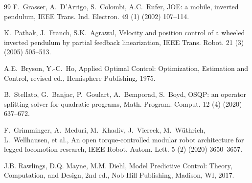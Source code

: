 \documentclass[a4paper,fleqn]{cas-dc}
\begin{document}
\begin{thebibliography}{99}
F.~Grasser, A.~D'Arrigo, S.~Colombi, A.C.~Rufer, JOE: a mobile, inverted
pendulum, IEEE Trans. Ind. Electron. 49 (1) (2002) 107--114.

K.~Pathak, J.~Franch, S.K.~Agrawal, Velocity and position control of a wheeled
inverted pendulum by partial feedback linearization, IEEE Trans. Robot. 21 (3)
(2005) 505--513.

A.E.~Bryson, Y.-C.~Ho, Applied Optimal Control: Optimization, Estimation and
Control, revised ed., Hemisphere Publishing, 1975.

B.~Stellato, G.~Banjac, P.~Goulart, A.~Bemporad, S.~Boyd, OSQP: an operator
splitting solver for quadratic programs, Math. Program. Comput. 12 (4) (2020)
637--672.

F.~Grimminger, A.~Meduri, M.~Khadiv, J.~Viereck, M.~W\"{u}thrich,
L.~Wellhausen, et al., An open torque-controlled modular robot architecture for
legged locomotion research, IEEE Robot. Autom. Lett. 5 (2) (2020) 3650--3657.

J.B. Rawlings, D.Q. Mayne, M.M. Diehl, Model Predictive Control: Theory,
Computation, and Design, 2nd ed., Nob Hill Publishing, Madison, WI, 2017.

\end{thebibliography}
\end{document}
